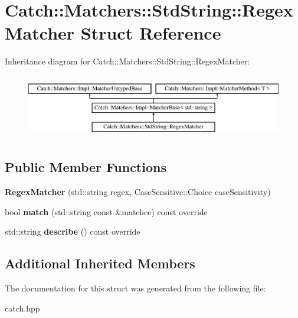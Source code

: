 \hypertarget{structCatch_1_1Matchers_1_1StdString_1_1RegexMatcher}{}\section{Catch\+::Matchers\+::Std\+String\+::Regex\+Matcher Struct Reference}
\label{structCatch_1_1Matchers_1_1StdString_1_1RegexMatcher}
Inheritance diagram for Catch\+::Matchers\+::Std\+String\+::Regex\+Matcher\+:\begin{figure}[H]
\begin{center}
\leavevmode
\includegraphics[height=2.818792cm]{structCatch_1_1Matchers_1_1StdString_1_1RegexMatcher}
\end{center}
\end{figure}
\subsection*{Public Member Functions}
\begin{DoxyCompactItemize}
\item 
\mbox{\label{structCatch_1_1Matchers_1_1StdString_1_1RegexMatcher_ab914deb885fe25558c41ab368c6b3916}} 
{\bfseries Regex\+Matcher} (std\+::string regex, Case\+Sensitive\+::\+Choice case\+Sensitivity)
\item 
\mbox{\label{structCatch_1_1Matchers_1_1StdString_1_1RegexMatcher_aa8e61adccabb2f36133029301f6b8f4e}} 
bool {\bfseries match} (std\+::string const \&matchee) const override
\item 
\mbox{\label{structCatch_1_1Matchers_1_1StdString_1_1RegexMatcher_a1f788cd5258c987e5043f6c7f43adeb9}} 
std\+::string {\bfseries describe} () const override
\end{DoxyCompactItemize}
\subsection*{Additional Inherited Members}


The documentation for this struct was generated from the following file\+:\begin{DoxyCompactItemize}
\item 
catch.\+hpp\end{DoxyCompactItemize}
